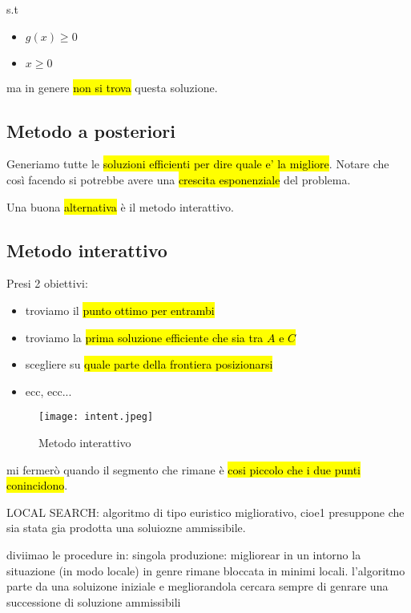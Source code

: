 s.t
\begin{itemize}
    \item $g(x) \geq 0$
    \item $x \geq 0$
\end{itemize}

ma in genere \hl{non si trova} questa soluzione.


\subsection{Metodo a posteriori}

Generiamo tutte le \hl{soluzioni efficienti per dire quale e' la migliore}. Notare che così facendo si potrebbe avere una \hl{crescita esponenziale} del problema.

Una buona \hl{alternativa} è il metodo interattivo.


\subsection{Metodo interattivo}

Presi 2 obiettivi:

\begin{itemize}
    \item troviamo il \hl{punto ottimo per entrambi}
    \item troviamo la \hl{prima soluzione efficiente che sia tra $A$ e $C$}
    \item scegliere su \hl{quale parte della frontiera posizionarsi}
    \item ecc, ecc...
\end{itemize}

\begin{figure}[H]
\centering
\texttt{[image: intent.jpeg]}
\caption{Metodo interattivo} 
\label{intent}
\end{figure}

mi fermerò quando il segmento che rimane è \hl{cosi piccolo che i due punti conincidono}.









LOCAL SEARCH:
algoritmo di tipo euristico migliorativo, cioe1 presuppone che sia stata gia prodotta una soluiozne ammissibile. 

diviimao le procedure in:
singola produzione: migliorear in un intorno la situazione (in modo locale) in genre rimane bloccata in minimi locali. l'algoritmo parte da una soluizone iniziale e megliorandola cercara sempre di genrare una successione di soluzione ammissibili

